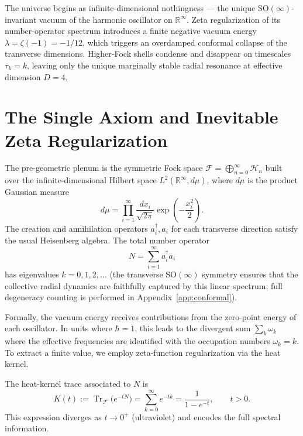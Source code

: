 \documentclass[11pt,a4paper,oneside]{article}
\begin{document}
\begin{tcolorbox}[
  colback=blue!5!white,
  colframe=blue!70!black,
  title={\bfseries The Single Axiom},
  fonttitle=\large\bfseries,
  boxrule=1.2pt,
  arc=4pt,
  left=9pt, right=9pt, top=9pt, bottom=9pt,
  coltitle=white
]
The universe begins as infinite-dimensional nothingness — the unique \(\mathrm{SO}(\infty)\)-invariant vacuum of the harmonic oscillator on \(\mathbb{R}^\infty\). Zeta regularization of its number-operator spectrum introduces a finite negative vacuum energy \(\lambda = \zeta(-1) = -1/12\), which triggers an overdamped conformal collapse of the transverse dimensions. Higher-Fock shells condense and disappear on timescales \(\tau_k = k\), leaving only the unique marginally stable radial resonance at effective dimension \(D=4\).
\end{tcolorbox}

\section{The Single Axiom and Inevitable Zeta Regularization}

The pre-geometric plenum is the symmetric Fock space \(\mathcal{F} = \bigoplus_{n=0}^\infty \mathcal{H}_n\) built over the infinite-dimensional Hilbert space \(L^2(\mathbb{R}^\infty, d\mu)\), where \(d\mu\) is the product Gaussian measure
\[
d\mu = \prod_{i=1}^\infty \frac{dx_i}{\sqrt{2\pi}} \exp\left(-\frac{x_i^2}{2}\right).
\]
The creation and annihilation operators \(a_i^\dagger, a_i\) for each transverse direction satisfy the usual Heisenberg algebra. The total number operator
\[
N = \sum_{i=1}^\infty a_i^\dagger a_i
\]
has eigenvalues \(k = 0,1,2,\dots\) (the transverse \(\mathrm{SO}(\infty)\) symmetry ensures that the collective radial dynamics are faithfully captured by this linear spectrum; full degeneracy counting is performed in Appendix~\ref{app:conformal}).

Formally, the vacuum energy receives contributions from the zero-point energy of each oscillator. In units where \(\hbar = 1\), this leads to the divergent sum \(\sum_k \omega_k\) where the effective frequencies are identified with the occupation numbers \(\omega_k = k\). To extract a finite value, we employ zeta-function regularization via the heat kernel.

The heat-kernel trace associated to \(N\) is
\[
K(t) := \operatorname{Tr}_{\mathcal{F}} \bigl( e^{-t N} \bigr) = \sum_{k=0}^\infty e^{-t k} = \frac{1}{1 - e^{-t}}, \qquad t > 0.
\]
This expression diverges as \(t \to 0^+\) (ultraviolet) and encodes the full spectral information.
\end{document}
